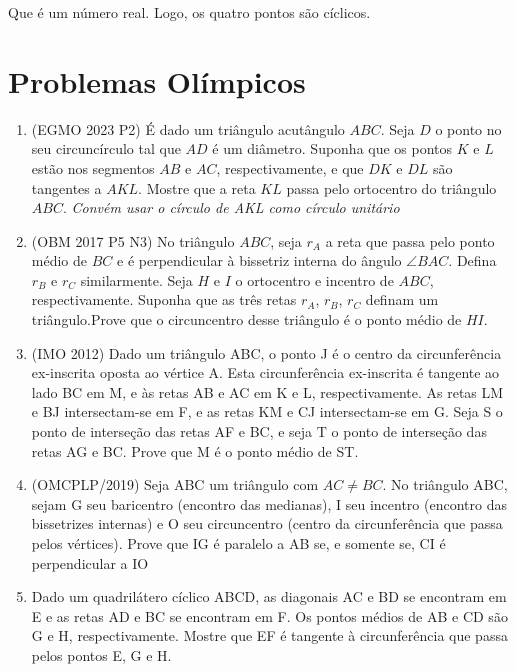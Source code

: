 \documentclass{article}
\begin{document}
Que é um número real. Logo, os quatro pontos são cíclicos.

\section{Problemas Olímpicos }

\begin{enumerate}
    \item (EGMO 2023 P2)
 É dado um triângulo acutângulo $ABC$. Seja $D$ o ponto no seu circuncírculo tal que $AD$ é um diâmetro. Suponha que os pontos $K$ e $L$ estão nos segmentos $AB$ e $AC$, respectivamente, e que $DK$ e $DL$ são tangentes a $AKL$.
Mostre que a reta $KL$ passa pelo ortocentro do triângulo $ABC$.
    \textit{Convém usar o círculo de AKL como círculo unitário}
\item (OBM 2017 P5 N3)
No triângulo $ABC$, seja $r_A$ a reta que passa pelo ponto médio de $BC$ e é perpendicular à bissetriz interna do ângulo $\angle{BAC}$. Defina $r_B$ e $r_C$ similarmente. Seja $H$ e $I$ o ortocentro e incentro de $ABC$, respectivamente. Suponha que as três retas $r_A$, $r_B$, $r_C$ definam um triângulo.Prove que o circuncentro desse triângulo é o ponto médio de $HI$.
\item 
(IMO 2012) Dado um triângulo ABC, o ponto J é o centro da circunferência ex-inscrita oposta ao vértice A. Esta circunferência ex-inscrita é
tangente ao lado BC em M, e às retas AB e AC em K e L, respectivamente. As retas LM e BJ intersectam-se em F, e as retas KM e CJ
intersectam-se em G. Seja S o ponto de interseção das retas AF e BC, e
seja T o ponto de interseção das retas AG e BC.
Prove que M é o ponto médio de ST.
\item 
(OMCPLP/2019) Seja ABC um triângulo com $AC \neq BC$. No triângulo
ABC, sejam G seu baricentro (encontro das medianas), I seu incentro
(encontro das bissetrizes internas) e O seu circuncentro (centro da circunferência que passa pelos vértices). Prove que IG é paralelo a AB se,
e somente se, CI é perpendicular a IO
\item 
Dado um quadrilátero cíclico ABCD, as diagonais AC e BD se encontram em E e as retas
AD e BC se encontram em F. Os pontos médios de AB e CD são G e H, respectivamente. Mostre que EF
é tangente à circunferência que passa pelos pontos E, G e H.


\end{enumerate}
\end{document}
